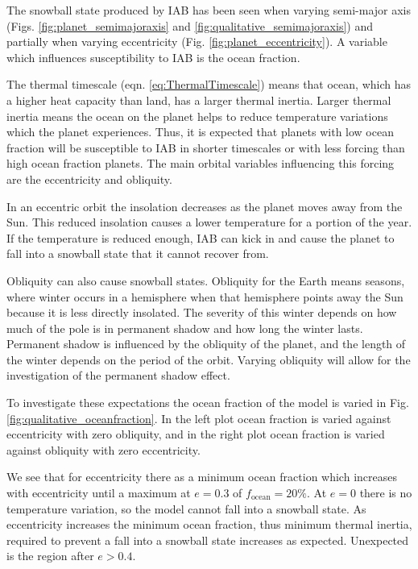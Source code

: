 \documentclass[12pt, onecolumn]{revtex4-2}    %
\begin{document}
The snowball state produced by IAB has been seen when varying semi-major axis (Figs. \ref{fig:planet_semimajoraxis} and \ref{fig:qualitative_semimajoraxis}) and partially when varying eccentricity (Fig. \ref{fig:planet_eccentricity}).
A variable which influences susceptibility to IAB is the ocean fraction.

The thermal timescale (eqn. \eqref{eq:ThermalTimescale}) means that ocean, which has a higher heat capacity than land, has a larger thermal inertia.
Larger thermal inertia means the ocean on the planet helps to reduce temperature variations which the planet experiences.
Thus, it is expected that planets with low ocean fraction will be susceptible to IAB in shorter timescales or with less forcing than high ocean fraction planets.
The main orbital variables influencing this forcing are the eccentricity and obliquity.

In an eccentric orbit the insolation decreases as the planet moves away from the Sun.
This reduced insolation causes a lower temperature for a portion of the year.
If the temperature is reduced enough, IAB can kick in and cause the planet to fall into a snowball state that it cannot recover from.

Obliquity can also cause snowball states.
Obliquity for the Earth means seasons, where winter occurs in a hemisphere when that hemisphere points away the Sun because it is less directly insolated.
The severity of this winter depends on how much of the pole is in permanent shadow and how long the winter lasts.
Permanent shadow is influenced by the obliquity of the planet, and the length of the winter depends on the period of the orbit.
Varying obliquity will allow for the investigation of the permanent shadow effect.

To investigate these expectations the ocean fraction of the model is varied in Fig. \ref{fig:qualitative_oceanfraction}.
In the left plot ocean fraction is varied against eccentricity with zero obliquity, and in the right plot ocean fraction is varied against obliquity with zero eccentricity.

We see that for eccentricity there as a minimum ocean fraction which increases with eccentricity until a maximum at $e=0.3$ of $f_\text{ocean} = 20\%$.
At $e=0$ there is no temperature variation, so the model cannot fall into a snowball state.
As eccentricity increases the minimum ocean fraction, thus minimum thermal inertia, required to prevent a fall into a snowball state increases as expected.
Unexpected is the region after $e > 0.4$.
\end{document}
